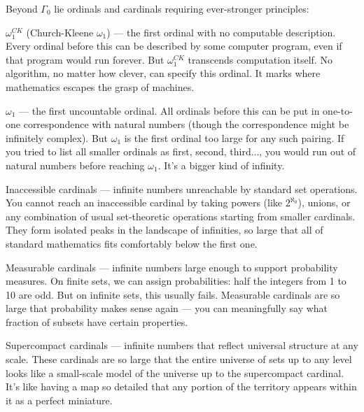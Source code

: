 Beyond $\Gamma_0$ lie ordinals and cardinals requiring ever-stronger principles:

$\omega_1^{CK}$ (Church-Kleene $\omega_1$) — the first ordinal with no computable description. Every ordinal before this can be described by some computer program, even if that program would run forever. But $\omega_1^{CK}$ transcends computation itself. No algorithm, no matter how clever, can specify this ordinal. It marks where mathematics escapes the grasp of machines.

$\omega_1$ — the first uncountable ordinal. All ordinals before this can be put in one-to-one correspondence with natural numbers (though the correspondence might be infinitely complex). But $\omega_1$ is the first ordinal too large for any such pairing. If you tried to list all smaller ordinals as first, second, third..., you would run out of natural numbers before reaching $\omega_1$. It's a bigger kind of infinity.

Inaccessible cardinals — infinite numbers unreachable by standard set operations. You cannot reach an inaccessible cardinal by taking powers (like $2^{\aleph_0}$), unions, or any combination of usual set-theoretic operations starting from smaller cardinals. They form isolated peaks in the landscape of infinities, so large that all of standard mathematics fits comfortably below the first one.

Measurable cardinals — infinite numbers large enough to support probability measures. On finite sets, we can assign probabilities: half the integers from 1 to 10 are odd. But on infinite sets, this usually fails. Measurable cardinals are so large that probability makes sense again — you can meaningfully say what fraction of subsets have certain properties.

Supercompact cardinals — infinite numbers that reflect universal structure at any scale. These cardinals are so large that the entire universe of sets up to any level looks like a small-scale model of the universe up to the supercompact cardinal. It's like having a map so detailed that any portion of the territory appears within it as a perfect miniature.
